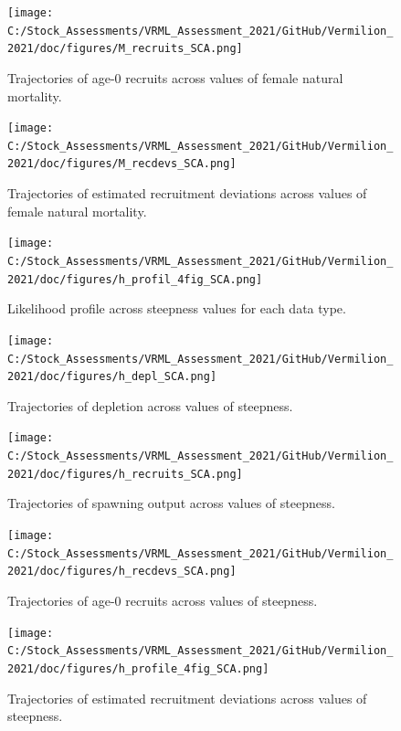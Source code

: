 \documentclass[
  english,
  a4paper,
]{article}
\begin{document}
\begin{figure}
\centering
\texttt{[image: C:/Stock\_Assessments/VRML\_Assessment\_2021/GitHub/Vermilion\_2021/doc/figures/M\_recruits\_SCA.png]}
\caption{Trajectories of age-0 recruits across values of female natural mortality.\label{fig:m-recruits}}
\end{figure}

\begin{figure}
\centering
\texttt{[image: C:/Stock\_Assessments/VRML\_Assessment\_2021/GitHub/Vermilion\_2021/doc/figures/M\_recdevs\_SCA.png]}
\caption{Trajectories of estimated recruitment deviations across values of female natural mortality.\label{fig:m-recdevs}}
\end{figure}

\begin{figure}
\centering
\texttt{[image: C:/Stock\_Assessments/VRML\_Assessment\_2021/GitHub/Vermilion\_2021/doc/figures/h\_profil\_4fig\_SCA.png]}
\caption{Likelihood profile across steepness values for each data type.\label{fig:h-profile}}
\end{figure}

\begin{figure}
\centering
\texttt{[image: C:/Stock\_Assessments/VRML\_Assessment\_2021/GitHub/Vermilion\_2021/doc/figures/h\_depl\_SCA.png]}
\caption{Trajectories of depletion across values of steepness.\label{fig:h-depl}}
\end{figure}

\begin{figure}
\centering
\texttt{[image: C:/Stock\_Assessments/VRML\_Assessment\_2021/GitHub/Vermilion\_2021/doc/figures/h\_recruits\_SCA.png]}
\caption{Trajectories of spawning output across values of steepness.\label{fig:h-spawn}}
\end{figure}

\begin{figure}
\centering
\texttt{[image: C:/Stock\_Assessments/VRML\_Assessment\_2021/GitHub/Vermilion\_2021/doc/figures/h\_recdevs\_SCA.png]}
\caption{Trajectories of age-0 recruits across values of steepness.\label{fig:h-recruits}}
\end{figure}

\begin{figure}
\centering
\texttt{[image: C:/Stock\_Assessments/VRML\_Assessment\_2021/GitHub/Vermilion\_2021/doc/figures/h\_profile\_4fig\_SCA.png]}
\caption{Trajectories of estimated recruitment deviations across values of steepness.\label{fig:h-recdevs}}
\end{figure}
\end{document}
